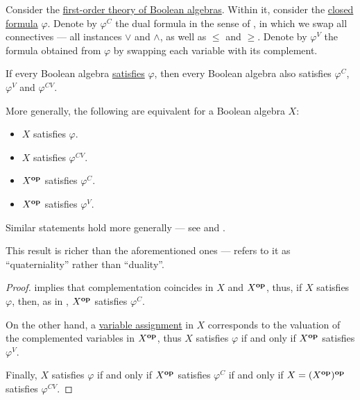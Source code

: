 \begin{theorem}\label{thm:boolean_algebra_duality}
  Consider the \hyperref[def:lattice/theory]{first-order theory of Boolean algebras}. Within it, consider the \hyperref[def:first_order_syntax/closed_formula]{closed formula} \( \varphi \). Denote by \( \varphi^C \) the dual formula in the sense of , in which we swap all connectives --- all instances \( \vee \) and \( \wedge \), as well as \( \leq \) and \( \geq \). Denote by \( \varphi^V \) the formula obtained from \( \varphi \) by swapping each variable with its complement.

  If every Boolean algebra \hyperref[def:first_order_model]{satisfies} \( \varphi \), then every Boolean algebra also satisfies \( \varphi^C \), \( \varphi^V \) and \( \varphi^{CV} \).

  More generally, the following are equivalent for a Boolean algebra \( X \):
  \begin{TwoColumns}
    \begin{itemize}
      \item \( X \) satisfies \( \varphi \).
      \item \( X \) satisfies \( \varphi^{CV} \).
    \end{itemize}
    \BeginSecondColumn
    \begin{itemize}
      \item \( X^\oppos \) satisfies \( \varphi^C \).
      \item \( X^\oppos \) satisfies \( \varphi^V \).
    \end{itemize}
  \end{TwoColumns}
\end{theorem}
\begin{comments}
  \item Similar statements hold more generally --- see  and .

  \item This result is richer than the aforementioned ones ---  refers to it as \enquote{quaterniality} rather than \enquote{duality}.
\end{comments}
\begin{proof}
   implies that complementation coincides in \( X \) and \( X^\oppos \), thus, if \( X \) satisfies \( \varphi \), then, as in , \( X^\oppos \) satisfies \( \varphi^C \).

  On the other hand, a \hyperref[def:first_order_valuation/variable_assignment]{variable assignment} in \( X \) corresponds to the valuation of the complemented variables in \( X^\oppos \), thus \( X \) satisfies \( \varphi \) if and only if \( X^\oppos \) satisfies \( \varphi^V \).

  Finally, \( X \) satisfies \( \varphi \) if and only if \( X^\oppos \) satisfies \( \varphi^C \) if and only if \( X = (X^\oppos)^\oppos \) satisfies \( \varphi^{CV} \).
\end{proof}

